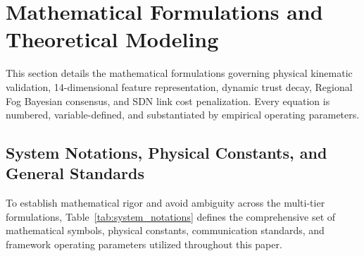 \documentclass[conference]{IEEEtran}
\begin{document}
\section{Mathematical Formulations and Theoretical Modeling}
\label{sec:math_formulations}

This section details the mathematical formulations governing physical kinematic validation, 14-dimensional feature representation, dynamic trust decay, Regional Fog Bayesian consensus, and SDN link cost penalization. Every equation is numbered, variable-defined, and substantiated by empirical operating parameters.

\subsection{System Notations, Physical Constants, and General Standards}
\label{sec:system_notations}

To establish mathematical rigor and avoid ambiguity across the multi-tier formulations, Table~\ref{tab:system_notations} defines the comprehensive set of mathematical symbols, physical constants, communication standards, and framework operating parameters utilized throughout this paper.
\end{document}
